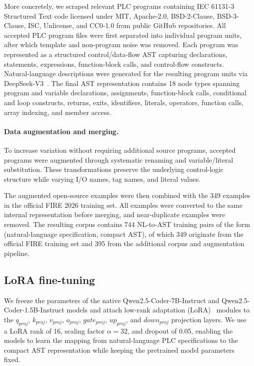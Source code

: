 \documentclass{ceurart}
\begin{document}
More concretely, we scraped relevant PLC programs containing IEC 61131-3 Structured Text code licensed under MIT, Apache-2.0, BSD-2-Clause, BSD-3-Clause, ISC, Unlicense, and CC0-1.0 from public GitHub repositories. All accepted PLC program files were first separated into individual program units, after which template and non-program noise was removed. Each program was represented as a structured control/data-flow AST capturing declarations, statements, expressions, function-block calls, and control-flow constructs. Natural-language descriptions were generated for the resulting program units via DeepSeek-V3~\cite{deepseekv3}. The final AST representation contains 18 node types spanning program and variable declarations, assignments, function-block calls, conditional and loop constructs, returns, exits, identifiers, literals, operators, function calls, array indexing, and member access.

\paragraph{Data augmentation and merging.}
To increase variation without requiring additional source programs, accepted programs were augmented through systematic renaming and variable/literal substitution. These transformations preserve the underlying control-logic structure while varying I/O names, tag names, and literal values.

The augmented open-source examples were then combined with the 349 examples in the official FIRE 2026 training set. All examples were converted to the same internal representation before merging, and near-duplicate examples were removed. The resulting corpus contains 744 NL-to-AST training pairs of the form (natural-language specification, compact AST), of which 349 originate from the official FIRE training set and 395 from the additional corpus and augmentation pipeline.

\subsection{LoRA fine-tuning}
We freeze the parameters of the native Qwen2.5-Coder-7B-Instruct and Qwen2.5-Coder-1.5B-Instruct models and attach low-rank adaptation (LoRA)~\cite{hu2022lora} modules to the $q_{proj}$, $k_{proj}$, $v_{proj}$, $o_{proj}$, $gate_{proj}$, $up_{proj}$, and $down_{proj}$ projection layers. We use a LoRA rank of 16, scaling factor $\alpha=32$, and dropout of 0.05, enabling the models to learn the mapping from natural-language PLC specifications to the compact AST representation while keeping the pretrained model parameters fixed.
\end{document}
